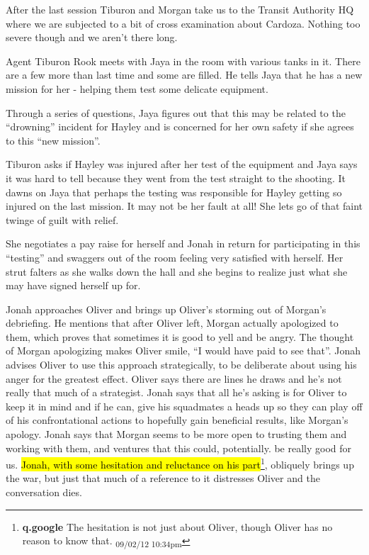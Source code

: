 \newpage
{} 



After the last session Tiburon and Morgan take us to the Transit Authority HQ where we are subjected to a bit of cross examination about Cardoza.  Nothing too severe though and we aren't there long.



Agent Tiburon Rook meets with Jaya in the room with various tanks in it.  There are a few more than last time and some are filled.  He tells Jaya that he has a new mission for her - helping them test some delicate equipment.



Through a series of questions, Jaya figures out that this may be related to the ``drowning'' incident for Hayley and is concerned for her own safety if she agrees to this ``new mission''.



Tiburon asks if Hayley was injured after her test of the equipment and Jaya says it was hard to tell because they went from the test straight to the shooting.   It dawns on Jaya that perhaps the testing was responsible for Hayley getting so injured on the last mission.  It may not be her fault at all!  She lets go of that faint twinge of guilt with relief.



She negotiates a pay raise for herself and Jonah in return for participating in this ``testing'' and swaggers out of the room feeling very satisfied with herself.  Her strut falters as she walks down the hall and she begins to realize just what she may have signed herself up for.



Jonah approaches Oliver and brings up Oliver's storming out of Morgan's debriefing.  He mentions that after Oliver left, Morgan actually apologized to them, which proves that sometimes it is good to yell and be angry.  The thought of Morgan apologizing makes Oliver smile, ``I would have paid to see that''.  Jonah advises Oliver to use this approach strategically, to be deliberate about using his anger for the greatest effect.  Oliver says there are lines he draws and he's not really that much of a strategist.  Jonah says that all he's asking is for Oliver to keep it in mind and if he can, give his squadmates a heads up so they can play off of his confrontational actions to hopefully gain beneficial results, like Morgan's apology.  Jonah says that Morgan seems to be more open to trusting them and working with them, and ventures that this could, potentially. be really good for us.  \hl{Jonah, with some hesitation and reluctance on his part}\footnote{\textbf{q.google }The hesitation is not just about Oliver, though Oliver has no reason to know that. \textsubscript{09/02/12 10:34pm}}, obliquely brings up the war, but just that much of a reference to it distresses Oliver and the conversation dies.



